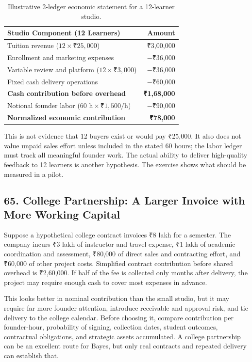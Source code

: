 \begin{table}[htbp]
\centering
\small
\begin{tabularx}{\columnwidth}{Xr}
\toprule
\textbf{Studio Component (12 Learners)} & \textbf{Amount} \\
\midrule
Tuition revenue ($12 \times ₹25,000$) & ₹3,00,000 \\
Enrollment and marketing expenses & $-$₹36,000 \\
Variable review and platform ($12 \times ₹3,000$) & $-$₹36,000 \\
Fixed cash delivery operations & $-$₹60,000 \\
\midrule
\textbf{Cash contribution before overhead} & \textbf{₹1,68,000} \\
Notional founder labor ($60\text{ h} \times ₹1,500/\text{h}$) & $-$₹90,000 \\
\midrule
\textbf{Normalized economic contribution} & \textbf{₹78,000} \\
\bottomrule
\end{tabularx}
\caption{Illustrative 2-ledger economic statement for a 12-learner studio.}
\label{tab:bayes-d2c-two-ledger}
\end{table}

This is not evidence that 12 buyers exist or would pay ₹25,000. It also does not value unpaid sales effort unless included in the stated 60 hours; the labor ledger must track all meaningful founder work. The actual ability to deliver high-quality feedback to 12 learners is another hypothesis. The exercise shows what should be measured in a pilot.

\subsection*{65. College Partnership: A Larger Invoice with More Working Capital}

Suppose a hypothetical college contract invoices ₹8 lakh for a semester. The company incurs ₹3 lakh of instructor and travel expense, ₹1 lakh of academic coordination and assessment, ₹80,000 of direct sales and contracting effort, and ₹60,000 of other project costs. Simplified contract contribution before shared overhead is ₹2,60,000. If half of the fee is collected only months after delivery, the project may require enough cash to cover most expenses in advance.

This looks better in nominal contribution than the small studio, but it may require far more founder attention, introduce receivable and approval risk, and tie delivery to the college calendar. Before choosing it, compare contribution per founder-hour, probability of signing, collection dates, student outcomes, contractual obligations, and strategic assets accumulated. A college partnership can be an excellent route for Bayes, but only real contracts and repeated delivery can establish that.

